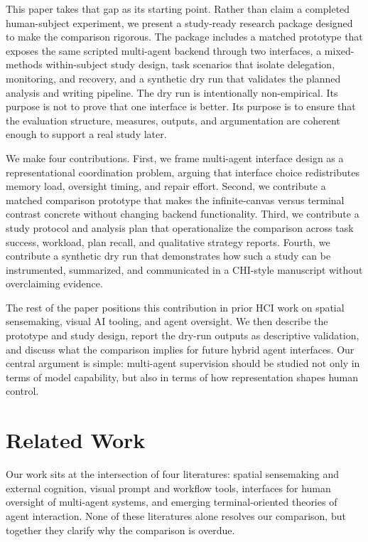 \documentclass[sigconf]{acmart}
\begin{document}
This paper takes that gap as its starting point. Rather than claim a completed human-subject experiment, we present a study-ready research package designed to make the comparison rigorous. The package includes a matched prototype that exposes the same scripted multi-agent backend through two interfaces, a mixed-methods within-subject study design, task scenarios that isolate delegation, monitoring, and recovery, and a synthetic dry run that validates the planned analysis and writing pipeline. The dry run is intentionally non-empirical. Its purpose is not to prove that one interface is better. Its purpose is to ensure that the evaluation structure, measures, outputs, and argumentation are coherent enough to support a real study later.

We make four contributions. First, we frame multi-agent interface design as a representational coordination problem, arguing that interface choice redistributes memory load, oversight timing, and repair effort. Second, we contribute a matched comparison prototype that makes the infinite-canvas versus terminal contrast concrete without changing backend functionality. Third, we contribute a study protocol and analysis plan that operationalize the comparison across task success, workload, plan recall, and qualitative strategy reports. Fourth, we contribute a synthetic dry run that demonstrates how such a study can be instrumented, summarized, and communicated in a CHI-style manuscript without overclaiming evidence.

The rest of the paper positions this contribution in prior HCI work on spatial sensemaking, visual AI tooling, and agent oversight. We then describe the prototype and study design, report the dry-run outputs as descriptive validation, and discuss what the comparison implies for future hybrid agent interfaces. Our central argument is simple: multi-agent supervision should be studied not only in terms of model capability, but also in terms of how representation shapes human control.

\section{Related Work}
Our work sits at the intersection of four literatures: spatial sensemaking and external cognition, visual prompt and workflow tools, interfaces for human oversight of multi-agent systems, and emerging terminal-oriented theories of agent interaction. None of these literatures alone resolves our comparison, but together they clarify why the comparison is overdue.
\end{document}
